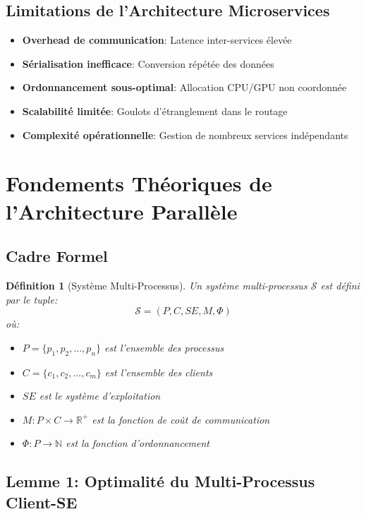 \documentclass[12pt,a4paper]{article}
\newtheorem{definition}{Définition}
\begin{document}
\subsection{Limitations de l'Architecture Microservices}

\begin{itemize}
    \item \textbf{Overhead de communication}: Latence inter-services élevée
    \item \textbf{Sérialisation inefficace}: Conversion répétée des données
    \item \textbf{Ordonnancement sous-optimal}: Allocation CPU/GPU non coordonnée
    \item \textbf{Scalabilité limitée}: Goulots d'étranglement dans le routage
    \item \textbf{Complexité opérationnelle}: Gestion de nombreux services indépendants
\end{itemize}

\section{Fondements Théoriques de l'Architecture Parallèle}

\subsection{Cadre Formel}

\begin{definition}[Système Multi-Processus]
Un système multi-processus $\mathcal{S}$ est défini par le tuple:
$$\mathcal{S} = (P, C, SE, M, \Phi)$$
où:
\begin{itemize}
    \item $P = \{p_1, p_2, ..., p_n\}$ est l'ensemble des processus
    \item $C = \{c_1, c_2, ..., c_m\}$ est l'ensemble des clients
    \item $SE$ est le système d'exploitation
    \item $M: P \times C \rightarrow \mathbb{R}^+$ est la fonction de coût de communication
    \item $\Phi: P \rightarrow \mathbb{N}$ est la fonction d'ordonnancement
\end{itemize}
\end{definition}

\subsection{Lemme 1: Optimalité du Multi-Processus Client-SE}
\end{document}
